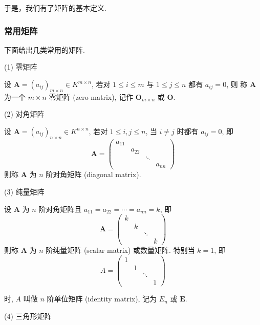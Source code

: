 \documentclass{article}
\begin{document}
于是，我们有了矩阵的基本定义.

\subsubsection{常用矩阵}

下面给出几类常用的矩阵.

(1) 零矩阵

设 $\boldsymbol{A}=\left(a_{i j}\right)_{m \times n} \in K^{m \times n}$, 若对 $1 \leq i \leq m$ 与 $1 \leq j \leq n$ 都有 $a_{i j}=0$, 则 称 $\boldsymbol{A}$ 为一个 $m \times n$ 零矩阵 (zero matrix), 记作 $\boldsymbol{O}_{m \times n}$ 或 $\boldsymbol{O}$.

(2) 对角矩阵

设 $\boldsymbol{A}=\left(a_{i j}\right)_{n \times n} \in K^{n \times n}$, 若对 $1 \leq i, j \leq n$, 当 $i \neq j$ 时都有 $a_{i j}=0$, 即
$$
\boldsymbol{A}=\left(\begin{array}{cccc}
	a_{11} & & & \\
	& a_{22} & & \\
	& & \ddots & \\
	& & & a_{n n}
\end{array}\right)
$$
则称 $\boldsymbol{A}$ 为 $n$ 阶对角矩阵 (diagonal matrix).

(3) 纯量矩阵

设 $\boldsymbol{A}$ 为 $n$ 阶对角矩阵且 $a_{11}=a_{22}=\cdots=a_{n n}=k$, 即
$$
\boldsymbol{A}=\left(\begin{array}{cccc}
	k & & & \\
	& k & & \\
	& & \ddots & \\
	& & & k
\end{array}\right)
$$
则称 $\boldsymbol{A}$ 为 $n$ 阶纯量矩阵 (scalar matrix) 或数量矩阵. 特别当 $k=1$, 即
$$
A=\left(\begin{array}{llll}
	1 & & & \\
	& 1 & & \\
	& & \ddots & \\
	& & & 1
\end{array}\right)
$$

时, $A$ 叫做 $n$ 阶单位矩阵 (identity matrix), 记为 $E_{n}$ 或 $\boldsymbol{E}$.

(4) 三角形矩阵
\end{document}
